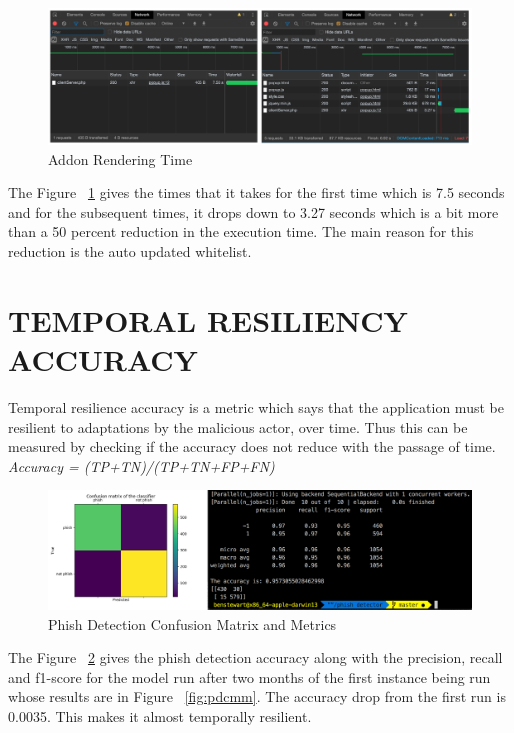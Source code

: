 \begin{figure}[htp]
\centering
\includegraphics[scale=0.25]{Figures/image14.png}
\caption{Addon Rendering Time}
\label{fig:art}
\end{figure}

The Figure  ~\ref{fig:art} gives the times that it takes for the first time which is 7.5 seconds and for the subsequent times, it drops down to 3.27 seconds which is a bit more than a 50 percent reduction in the execution time. The main reason for this reduction is the auto updated whitelist.

\section{TEMPORAL RESILIENCY ACCURACY}
Temporal resilience accuracy is a metric which says that the application must be resilient to adaptations by the malicious actor, over time. Thus this can be measured by checking if the accuracy does not reduce with the passage of time.\\
\null\quad\textit{Accuracy = (TP+TN)/(TP+TN+FP+FN)}\\

\begin{figure}[htp]
\centering
\includegraphics[scale=0.2]{Figures/image8.png}
\caption{Phish Detection Confusion Matrix and Metrics}
\label{fig:pdcmm2}
\end{figure}

The Figure  ~\ref{fig:pdcmm2} gives the phish detection accuracy along with the precision, recall and f1-score for the model run after two months of the first instance being run whose results are in Figure ~\ref{fig:pdcmm}. The accuracy drop from the first run is 0.0035. This makes it almost temporally resilient.









